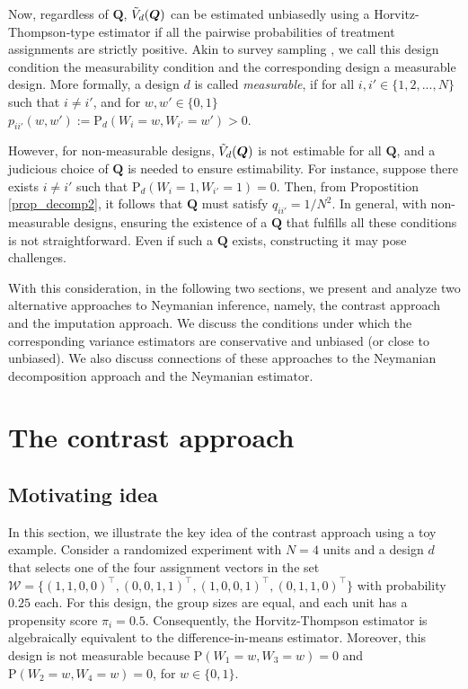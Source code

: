 \documentclass[12pt]{article}
\renewcommand{\Pr}{{\text{P}}}
\begin{document}
Now, regardless of $\bm{Q}$, $\Tilde{V}_d(\bm{Q})$ can be estimated unbiasedly using a Horvitz-Thompson-type estimator if all the pairwise probabilities of treatment assignments are strictly positive. Akin to survey sampling \cite{kish1965survey}, we call this design condition the measurability condition and the corresponding design a measurable design. More formally, a design $d$ is called \textit{measurable}, if for all $i,i' \in \{1,2,...,N\}$ such that $i \neq i'$, and for $w,w' \in \{0,1\}$ $p_{ii'}(w,w') :=\Pr_d(W_i = w, W_{i'} = w')>0$. 

However, for non-measurable designs, $\Tilde{V}_d(\bm{Q})$ is not estimable for all $\bm{Q}$, and a judicious choice of $\bm{Q}$ is needed to ensure estimability. For instance, suppose there exists $i\neq i'$ such that $\Pr_d(W_i = 1,W_{i'} = 1) = 0$. Then, from Propostition \ref{prop_decomp2}, it follows that $\bm{Q}$ must satisfy $q_{ii'} = 1/{N^2}$. In general, with non-measurable designs, ensuring the existence of a $\bm{Q}$ that fulfills all these conditions is not straightforward. Even if such a $\bm{Q}$ exists, constructing it may pose challenges.

With this consideration, in the following two sections, we present and analyze two alternative approaches to Neymanian inference, namely, the contrast approach and the imputation approach. We discuss the conditions under which the corresponding variance estimators are conservative and unbiased (or close to unbiased). We also discuss connections of these approaches to the Neymanian decomposition approach and the Neymanian estimator.

 


\section{The contrast approach}
\label{sec_substitution}
\subsection{Motivating idea}
\label{sec_motivating_substitution}

In this section, we illustrate the key idea of the contrast approach using a toy example.
Consider a randomized experiment with $N = 4$ units and a design $d$ that selects one of the four assignment vectors in the set $\mathcal{W} = \{(1,1,0,0)^\top, (0,0,1,1)^\top, (1,0,0,1)^\top, (0,1,1,0)^\top\}$ with probability $0.25$ each. 
For this design, the group sizes are equal, and each unit has a propensity score $\pi_i = 0.5$. Consequently, the Horvitz-Thompson estimator is algebraically equivalent to the difference-in-means estimator.
Moreover, this design is not measurable because $\Pr(W_1 = w, W_3 = w) = 0$ and $\Pr(W_2 = w, W_4 = w) = 0$, for $w \in \{0,1\}$. 
\end{document}

